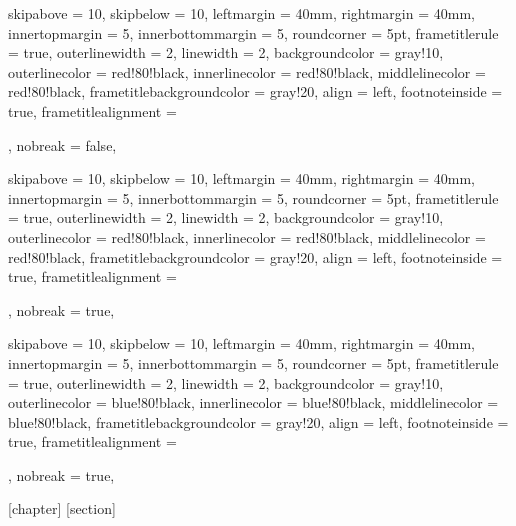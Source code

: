 {
skipabove         = 10,
skipbelow         = 10,
leftmargin        = 40mm,
rightmargin       = 40mm,
innertopmargin    = 5,
innerbottommargin = 5,
%
roundcorner =  5pt,
frametitlerule = true,
%
outerlinewidth  =  2,
linewidth = 2,
%
backgroundcolor = gray!10,
outerlinecolor  = red!80!black,
innerlinecolor  = red!80!black,
middlelinecolor = red!80!black,
frametitlebackgroundcolor = gray!20,
%
align = left,
footnoteinside = true,
frametitlealignment = \raggedright,
nobreak = false,
}

{
skipabove         = 10,
skipbelow         = 10,
leftmargin        = 40mm,
rightmargin       = 40mm,
innertopmargin    = 5,
innerbottommargin = 5,
%
roundcorner =  5pt,
frametitlerule = true,
%
outerlinewidth  =  2,
linewidth = 2,
%
backgroundcolor = gray!10,
outerlinecolor  = red!80!black,
innerlinecolor  = red!80!black,
middlelinecolor = red!80!black,
frametitlebackgroundcolor = gray!20,
%
align = left,
footnoteinside = true,
frametitlealignment = \raggedright,
nobreak = true,
}


{
skipabove         = 10,
skipbelow         = 10,
leftmargin        = 40mm,
rightmargin       = 40mm,
innertopmargin    = 5,
innerbottommargin = 5,
%
roundcorner =  5pt,
frametitlerule = true,
%
outerlinewidth  =  2,
linewidth = 2,
%
backgroundcolor = gray!10,
outerlinecolor  = blue!80!black,
innerlinecolor  = blue!80!black,
middlelinecolor = blue!80!black,
frametitlebackgroundcolor = gray!20,
%
align = left,
footnoteinside = true,
frametitlealignment = \raggedright,
nobreak = true,
}

[chapter]
[section]




